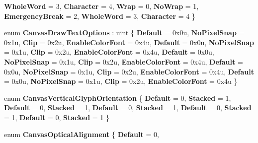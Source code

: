 \begin{DoxyCompactItemize}
{\bfseries Whole\+Word} = 3, 
{\bfseries Character} = 4, 
\newline
{\bfseries Wrap} = 0, 
{\bfseries No\+Wrap} = 1, 
{\bfseries Emergency\+Break} = 2, 
{\bfseries Whole\+Word} = 3, 
\newline
{\bfseries Character} = 4
 \}
\item 
\mbox{\label{namespace_microsoft_1_1_graphics_1_1_canvas_1_1_text_a186331309945bc8dcbfe364bc6f55fdb}} 
enum {\bfseries Canvas\+Draw\+Text\+Options} \+: uint \{ \newline
{\bfseries Default} = 0x0u, 
{\bfseries No\+Pixel\+Snap} = 0x1u, 
{\bfseries Clip} = 0x2u, 
{\bfseries Enable\+Color\+Font} = 0x4u, 
\newline
{\bfseries Default} = 0x0u, 
{\bfseries No\+Pixel\+Snap} = 0x1u, 
{\bfseries Clip} = 0x2u, 
{\bfseries Enable\+Color\+Font} = 0x4u, 
\newline
{\bfseries Default} = 0x0u, 
{\bfseries No\+Pixel\+Snap} = 0x1u, 
{\bfseries Clip} = 0x2u, 
{\bfseries Enable\+Color\+Font} = 0x4u, 
\newline
{\bfseries Default} = 0x0u, 
{\bfseries No\+Pixel\+Snap} = 0x1u, 
{\bfseries Clip} = 0x2u, 
{\bfseries Enable\+Color\+Font} = 0x4u, 
\newline
{\bfseries Default} = 0x0u, 
{\bfseries No\+Pixel\+Snap} = 0x1u, 
{\bfseries Clip} = 0x2u, 
{\bfseries Enable\+Color\+Font} = 0x4u
 \}
\item 
\mbox{\label{namespace_microsoft_1_1_graphics_1_1_canvas_1_1_text_ac948f04f716279fad132d07892e44d18}} 
enum {\bfseries Canvas\+Vertical\+Glyph\+Orientation} \{ \newline
{\bfseries Default} = 0, 
{\bfseries Stacked} = 1, 
{\bfseries Default} = 0, 
{\bfseries Stacked} = 1, 
\newline
{\bfseries Default} = 0, 
{\bfseries Stacked} = 1, 
{\bfseries Default} = 0, 
{\bfseries Stacked} = 1, 
\newline
{\bfseries Default} = 0, 
{\bfseries Stacked} = 1
 \}
\item 
\mbox{\label{namespace_microsoft_1_1_graphics_1_1_canvas_1_1_text_aa1f89365afa2b2891e65edc60ec74cdd}} 
enum {\bfseries Canvas\+Optical\+Alignment} \{ \newline
{\bfseries Default} = 0, 

\end{DoxyCompactItemize}
